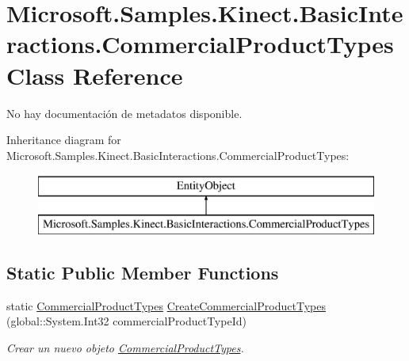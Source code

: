 \hypertarget{class_microsoft_1_1_samples_1_1_kinect_1_1_basic_interactions_1_1_commercial_product_types}{\section{Microsoft.\-Samples.\-Kinect.\-Basic\-Interactions.\-Commercial\-Product\-Types Class Reference}
\label{class_microsoft_1_1_samples_1_1_kinect_1_1_basic_interactions_1_1_commercial_product_types}
}


No hay documentación de metadatos disponible.  


Inheritance diagram for Microsoft.\-Samples.\-Kinect.\-Basic\-Interactions.\-Commercial\-Product\-Types\-:\begin{figure}[H]
\begin{center}
\leavevmode
\includegraphics[height=2.000000cm]{class_microsoft_1_1_samples_1_1_kinect_1_1_basic_interactions_1_1_commercial_product_types}
\end{center}
\end{figure}
\subsection*{Static Public Member Functions}
\begin{DoxyCompactItemize}
\item 
static \hyperlink{class_microsoft_1_1_samples_1_1_kinect_1_1_basic_interactions_1_1_commercial_product_types}{Commercial\-Product\-Types} \hyperlink{class_microsoft_1_1_samples_1_1_kinect_1_1_basic_interactions_1_1_commercial_product_types_aee5883bc6b63d958a8860e777d58b53b}{Create\-Commercial\-Product\-Types} (global\-::\-System.\-Int32 commercial\-Product\-Type\-Id)
\begin{DoxyCompactList}\small\item\em Crear un nuevo objeto \hyperlink{class_microsoft_1_1_samples_1_1_kinect_1_1_basic_interactions_1_1_commercial_product_types}{Commercial\-Product\-Types}. \end{DoxyCompactList}\end{DoxyCompactItemize}
